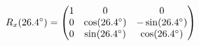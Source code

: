 \documentclass[preview]{standalone}
\begin{document}
\begin{align*}
\special{dvisvgm:raw <g id='unique000'>}R_x(26.4^\circ) = \begin{pmatrix} 1 & 0 & 0 \\ 0 & \cos(26.4^\circ) & -\sin(26.4^\circ) \\ 0 & \sin(26.4^\circ) & \cos(26.4^\circ) \end{pmatrix}\special{dvisvgm:raw </g>}
\end{align*}
\end{document}
